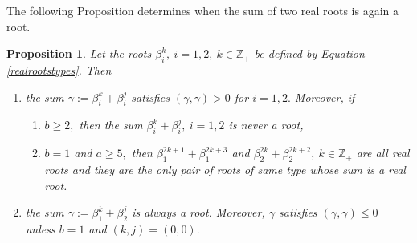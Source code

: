 \documentclass[12pt,reqno]{amsart}
\theoremstyle{plain}
\newtheorem{prop}{Proposition}
\theoremstyle{definition}
\theoremstyle{remark}
\newcommand\bz{\mathbb Z}
\begin{document}
The following Proposition determines when the sum of two real roots is again a root.
\begin{prop}\label{Nsumroot}
Let the roots $\beta_i^k,\ i=1,2,\ k\in\bz_+$ be defined by Equation \ref{realrootstypes}. Then 
\begin{enumerate}
    \item the sum $\gamma:=\beta_{i}^{k}+\beta_{i}^{j}$ satisfies $(\gamma,\gamma)>0$ for $i=1,2.$ Moreover, if 
    \begin{enumerate}
        \item $b\geq 2,$ then the sum $\beta_{i}^{k}+\beta_{i}^{j},\ i=1,2$ is never a root,
        \item $b=1$ and $a\geq 5,$ then $\beta_{1}^{2k+1}+\beta_{1}^{2k+3}$ and $\beta_{2}^{2k}+\beta_{2}^{2k+2},\ k\in\bz_+$ are all real roots and they are the only pair of roots of same type whose sum is a real root.
    \end{enumerate}
    \item the sum $\gamma:=\beta_{1}^{k}+\beta_{2}^{j}$ is always a root. Moreover, $\gamma$ satisfies $(\gamma,\gamma)\le 0$ unless $b=1$ and $(k,j)=(0,0).$ 
\end{enumerate}
\end{prop}
\end{document}
